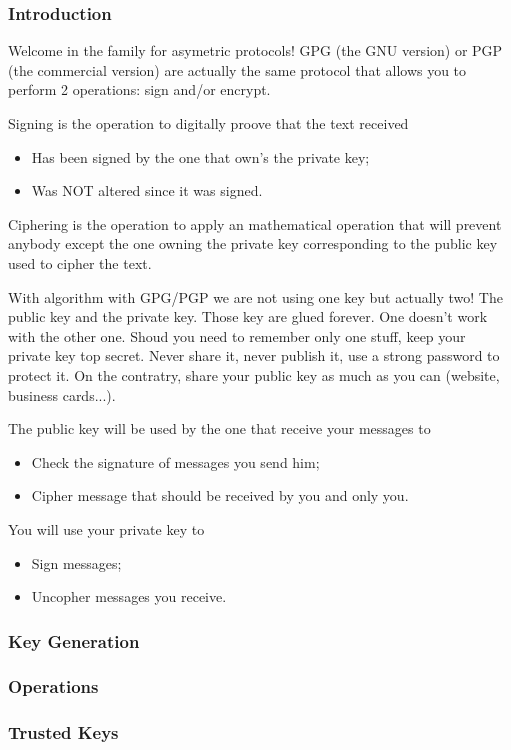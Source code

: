 \subsubsection{Introduction}

Welcome in the family for asymetric protocols!  GPG (the GNU version) or PGP (the commercial version) are actually the same protocol that allows you to perform 2 operations: sign and/or encrypt.

Signing is the operation to digitally proove that the text received
\begin{itemize}
    \item Has been signed by the one that own's the private key;
    \item Was NOT altered since it was signed.
\end{itemize}

Ciphering is the operation to apply an mathematical operation that will prevent anybody except the one owning the private key corresponding to the public key used to cipher the text.

With algorithm with GPG/PGP we are not using one key but actually two!  The public key and the private key.  Those key are glued forever.  One doesn't work with the other one.  Shoud you need to remember only one stuff, keep your private key top secret.  Never share it, never publish it, use a strong password to protect it.  On the contratry, share your public key as much as you can (website, business cards...).

The public key will be used by the one that receive your messages to
\begin{itemize}
    \item Check the signature of messages you send him;
    \item Cipher message that should be received by you and only you.
\end{itemize}

You will use your private key to
\begin{itemize}
    \item Sign messages;
    \item Uncopher messages you receive.
\end{itemize}


\subsubsection{Key Generation}

\subsubsection{Operations}

\subsubsection{Trusted Keys}


